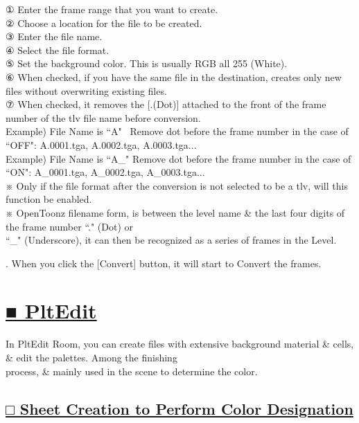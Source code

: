 \documentclass[a4paper,10pt]{article}
\begin{document}
\footnotesize
\noindent ① Enter the frame range that you want to create.\\
② Choose a location for the file to be created.\\
③ Enter the file name.\\
④ Select the file format.\\
⑤ Set the background color. This is usually RGB all 255 (White).\\
⑥ When checked, if you have the same file in the destination, creates only new files without overwriting existing files.\\
⑦ When checked, it removes the [.(Dot)] attached to the front of the frame number of the tlv file name before conversion.\\
Example) File Name is “A" \ Remove dot before the frame number in the case of “OFF": A.0001.tga, A.0002.tga, A.0003.tga...\\
Example) File Name is “A\_" Remove dot before the frame number in the case of “ON": A\_0001.tga, A\_0002.tga, A\_0003.tga...\\
※ Only if the file format after the conversion is not selected to be a tlv, will this function be enabled.\\
※ OpenToonz filename form, is between the level name \& the last four digits of the frame number “." (Dot) or\\
“\_" (Underscore), it can then be recognized as  a series of frames in the Level.\\
\par
\normalsize
{}. When you click the [Convert] button, it will start to Convert the frames.

\newpage

\section*{\uline{■ PltEdit}}

\footnotesize
\noindent In PltEdit Room, you can create files with extensive background material \& cells, \& edit the palettes. Among the finishing\\
process, \& mainly used in the scene to determine the color.\\

\subsection*{\uline{□ Sheet Creation to Perform Color Designation}}
\end{document}
